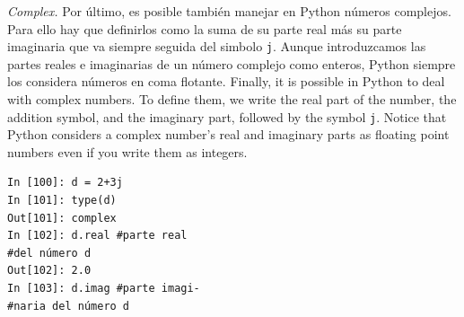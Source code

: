 \begin{paracol}{2}        
\emph{Complex.} Por último, es posible también manejar en Python números complejos. Para ello hay que definirlos como la suma de su parte real más su parte imaginaria que va siempre seguida del simbolo \texttt{j}. Aunque introduzcamos las partes reales e imaginarias de un número complejo como enteros, Python siempre los considera números en coma flotante.
\switchcolumn Finally, it is possible in Python to deal with complex numbers. To define them, we write the real part of the number, the addition symbol, and the imaginary part, followed by the symbol \texttt{j}. Notice that Python considers a complex number's real and imaginary parts as floating point numbers even if you write them as integers.  
\end{paracol}

\begin{center}
\begin{minipage}{0.2\textwidth}
\begin{verbatim}
In [100]: d = 2+3j
In [101]: type(d)
Out[101]: complex
In [102]: d.real #parte real
#del número d
Out[102]: 2.0
In [103]: d.imag #parte imagi-
#naria del número d
\end{verbatim}
\end{minipage}
\end{center}


\begin{figure}
\end{figure}

